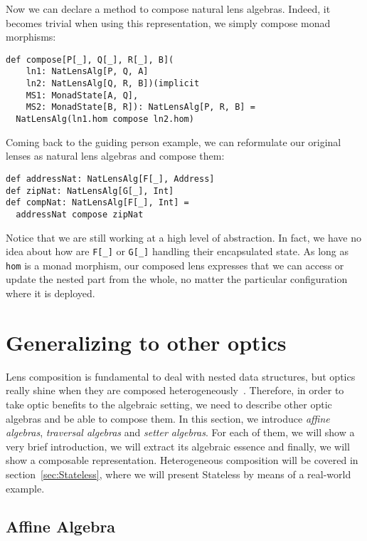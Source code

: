 \documentclass[final, twocolumn, 3p]{elsarticle}
\begin{document}
Now we can declare a method to compose natural lens algebras. Indeed, it becomes
trivial when using this representation, we simply compose monad morphisms:

\begin{lstlisting}
def compose[P[_], Q[_], R[_], B](
    ln1: NatLensAlg[P, Q, A]
    ln2: NatLensAlg[Q, R, B])(implicit
    MS1: MonadState[A, Q],
    MS2: MonadState[B, R]): NatLensAlg[P, R, B] =
  NatLensAlg(ln1.hom compose ln2.hom)
\end{lstlisting}

Coming back to the guiding person example, we can reformulate our original
lenses as natural lens algebras and compose them:

\begin{lstlisting}
def addressNat: NatLensAlg[F[_], Address]
def zipNat: NatLensAlg[G[_], Int]
def compNat: NatLensAlg[F[_], Int] =
  addressNat compose zipNat
\end{lstlisting}

Notice that we are still working at a high level of abstraction. In fact, we
have no idea about how are \lstinline{F[_]} or \lstinline{G[_]} handling their
encapsulated state. As long as \lstinline{hom} is a monad morphism, our composed
lens expresses that we can access or update the nested part from the whole, no
matter the particular configuration where it is deployed.

\section{Generalizing to other optics}
\label{sec:Generalizing}

Lens composition is fundamental to deal with nested data structures, but optics
really shine when they are composed
heterogeneously~\cite{pickering2017profunctor}. Therefore, in order to take
optic benefits to the algebraic setting, we need to describe other optic
algebras and be able to compose them. In this section, we introduce \emph{affine
algebras}, \emph{traversal algebras} and \emph{setter algebras}. For each of
them, we will show a very brief introduction, we will extract its algebraic
essence and finally, we will show a composable representation. Heterogeneous
composition will be covered in section~\ref{sec:Stateless}, where we will
present Stateless by means of a real-world example.

\subsection{Affine Algebra}
\end{document}
